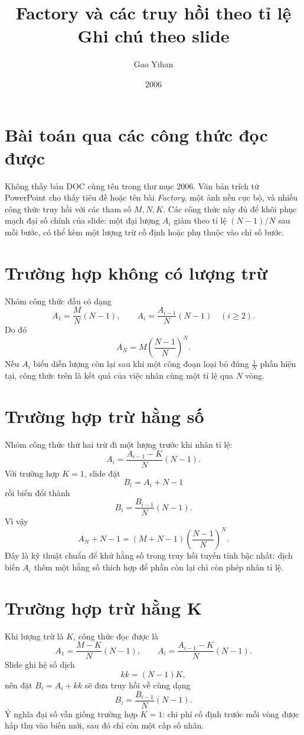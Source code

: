 \documentclass[11pt]{article}
\title{Factory và các truy hồi theo tỉ lệ\\{\large Ghi chú theo slide}}
\author{Gao Yihan}
\date{2006}
\begin{document}
\maketitle


\section{Bài toán qua các công thức đọc được}

Không thấy bản DOC cùng tên trong thư mục 2006. Văn bản trích từ PowerPoint
cho thấy tiêu đề hoặc tên bài \emph{Factory}, một ảnh nền cục bộ, và nhiều
công thức truy hồi với các tham số \(M,N,K\). Các công thức này đủ để khôi
phục mạch đại số chính của slide: một đại lượng \(A_i\) giảm theo tỉ lệ
\((N-1)/N\) sau mỗi bước, có thể kèm một lượng trừ cố định hoặc phụ thuộc
vào chỉ số bước.

\section{Trường hợp không có lượng trừ}

Nhóm công thức đầu có dạng
\[
  A_1=\frac{M}{N}(N-1),\qquad
  A_i=\frac{A_{i-1}}{N}(N-1)
  \quad (i\ge2).
\]
Do đó
\[
  A_N=M\left(\frac{N-1}{N}\right)^N.
\]
Nếu \(A_i\) biểu diễn lượng còn lại sau khi một công đoạn loại bỏ đúng
\(\frac1N\) phần hiện tại, công thức trên là kết quả của việc nhân cùng một
tỉ lệ qua \(N\) vòng.

\section{Trường hợp trừ hằng số}

Nhóm công thức thứ hai trừ đi một lượng trước khi nhân tỉ lệ:
\[
  A_i=\frac{A_{i-1}-K}{N}(N-1).
\]
Với trường hợp \(K=1\), slide đặt
\[
  B_i=A_i+N-1
\]
rồi biến đổi thành
\[
  B_i=\frac{B_{i-1}}{N}(N-1).
\]
Vì vậy
\[
  A_N+N-1=(M+N-1)\left(\frac{N-1}{N}\right)^N.
\]
Đây là kỹ thuật chuẩn để khử hằng số trong truy hồi tuyến tính bậc nhất:
dịch biến \(A_i\) thêm một hằng số thích hợp để phần còn lại chỉ còn phép
nhân tỉ lệ.

\section{Trường hợp trừ hằng K}

Khi lượng trừ là \(K\), công thức đọc được là
\[
  A_1=\frac{M-K}{N}(N-1),\qquad
  A_i=\frac{A_{i-1}-K}{N}(N-1).
\]
Slide ghi hệ số dịch
\[
  kk=(N-1)K,
\]
nên đặt \(B_i=A_i+kk\) sẽ đưa truy hồi về cùng dạng
\[
  B_i=\frac{B_{i-1}}{N}(N-1).
\]
Ý nghĩa đại số vẫn giống trường hợp \(K=1\): chi phí cố định trước mỗi vòng
được hấp thụ vào biến mới, sau đó chỉ còn một cấp số nhân.
\end{document}
